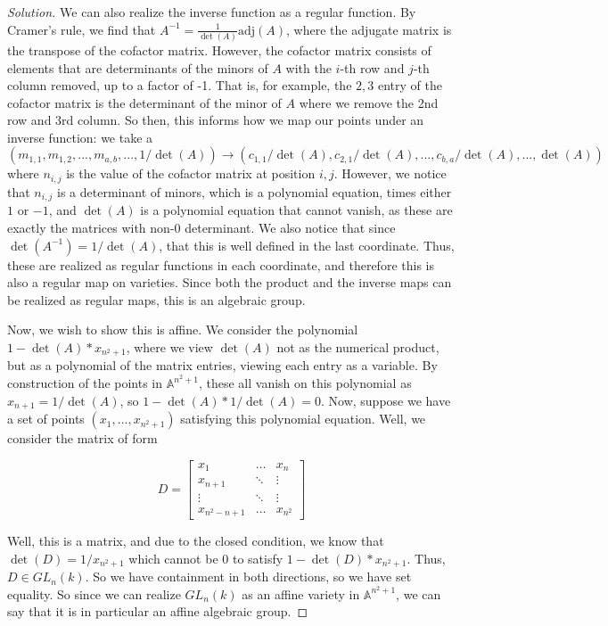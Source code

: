 \documentclass[10pt]{article}
\begin{document}
\begin{proof}[Solution]
We can also realize the inverse function as a regular function. By Cramer's rule, we find that $A^{-1} = \frac{1}{\det(A)} \text{adj}(A)$, where the adjugate matrix is the transpose of the cofactor matrix. However, the cofactor matrix consists of elements that are determinants of the minors of $A$ with the $i$-th row and $j$-th column removed, up to a factor of -1. That is, for example, the $2,3$ entry of the cofactor matrix is the determinant of the minor of $A$ where we remove the 2nd row and 3rd column. So then, this informs how we map our points under an inverse function: we take a $(m_{1,1}, m_{1,2},...,m_{a,b},...,1/\det(A)) \to (c_{1,1}/\det(A), c_{2,1}/\det(A),...,c_{b,a}/\det(A),...,\det(A))$ where $n_{i,j}$ is the value of the cofactor matrix at position $i,j$. However, we notice that $n_{i,j}$ is a determinant of minors, which is a polynomial equation, times either $1$ or $-1$, and $\det(A)$ is a polynomial equation that cannot vanish, as these are exactly the matrices with non-0 determinant. We also notice that since $\det(A^{-1}) = 1/\det(A)$, that this is well defined in the last coordinate. Thus, these are realized as regular functions in each coordinate, and therefore this is also a regular map on varieties. Since both the product and the inverse maps can be realized as regular maps, this is an algebraic group.

Now, we wish to show this is affine. We consider the polynomial $1 - \det(A)*x_{n^2+1}$, where we view $\det(A)$ not as the numerical product, but as a polynomial of the matrix entries, viewing each entry as a variable. By construction of the points in $\mathbb{A}^{n^2+1}$, these all vanish on this polynomial as $x_{n+1} = 1/\det(A)$, so $1 - \det(A) * 1/\det(A) = 0$. Now, suppose we have a set of points $(x_1,...,x_{n^2+1})$ satisfying this polynomial equation. Well, we consider the matrix of form 

$$ D = \begin{bmatrix} x_1 & \hdots  & x_n \\ x_{n+1} & \ddots & \vdots \\ \vdots & \ddots & \vdots \\ x_{n^2-n+1} & \hdots & x_{n^2} \end{bmatrix}$$

Well, this is a matrix, and due to the closed condition, we know that $\det(D) = 1/x_{n^2+1}$ which cannot be 0 to satisfy $1 - \det(D)*x_{n^2+1}$. Thus, $D \in GL_n(k)$. So we have containment in both directions, so we have set equality. So since we can realize $GL_n(k)$ as an affine variety in $\mathbb{A}^{n^2+1}$, we can say that it is in particular an affine algebraic group.


\end{proof}
\end{document}
